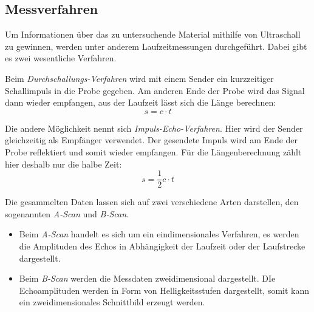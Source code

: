 \subsection{Messverfahren}
\label{sec:Messverfahren}
Um Informationen über das zu untersuchende Material mithilfe von Ultraschall zu gewinnen, werden unter anderem
Laufzeitmessungen durchgeführt. Dabei gibt es zwei wesentliche Verfahren.

Beim \textit{Durchschallungs-Verfahren} wird mit einem Sender ein kurzzeitiger Schallimpuls in die Probe gegeben.
Am anderen Ende der Probe wird das Signal dann wieder empfangen, aus der Laufzeit lässt sich die Länge berechnen:
\begin{equation}
    \label{eq:Durchschall}
    s=c\cdot t
\end{equation}

Die andere Möglichkeit nennt sich \textit{Impuls-Echo-Verfahren}. Hier wird der Sender gleichzeitig als Empfänger verwendet.
Der gesendete Impuls wird am Ende der Probe reflektiert und somit wieder empfangen.
Für die Längenberechnung zählt hier deshalb nur die halbe Zeit:
\begin{equation}
    \label{eq:Impuls-Echo}
    s=\frac{1}{2} c\cdot t
\end{equation}

Die gesammelten Daten lassen sich auf zwei verschiedene Arten darstellen,
den sogenannten \textit{A-Scan} und \textit{B-Scan}.
\begin{itemize}
    \item Beim \textit{A-Scan} handelt es sich um ein eindimensionales Verfahren, es werden die Amplituden
    des Echos in Abhängigkeit der Laufzeit oder der Laufstrecke dargestellt.
    \item Beim \textit{B-Scan} werden die Messdaten zweidimensional dargestellt. DIe Echoamplituden werden
    in Form von Helligkeitsstufen dargestellt, somit kann ein zweidimensionales Schnittbild erzeugt werden.
\end{itemize}